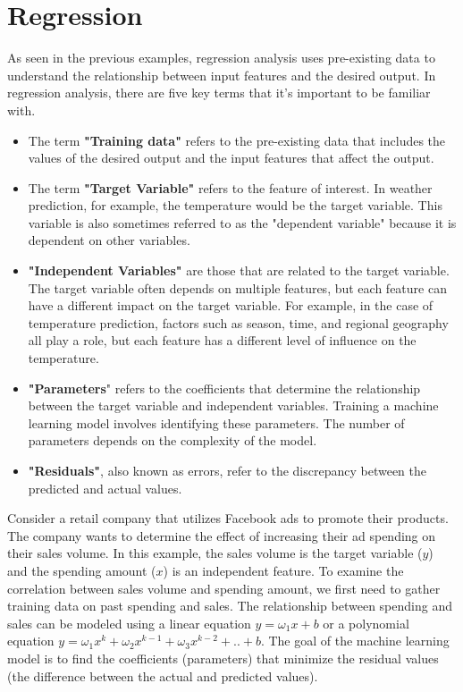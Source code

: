 \chapter{Regression}
As seen in the previous examples, regression analysis uses pre-existing data to understand the relationship between input features and the desired output. In regression analysis, there are five key terms that it's important to be familiar with.

\begin{itemize}
  \item The term \textbf{"Training data"} refers to the pre-existing data that includes the values of the desired output and the input features that affect the output.
  \item The term \textbf{"Target Variable"} refers to the feature of interest. In weather prediction, for example, the temperature would be the target variable. This variable is also sometimes referred to as the "dependent variable" because it is dependent on other variables.
  \item \textbf{"Independent Variables"} are those that are related to the target variable. The target variable often depends on multiple features, but each feature can have a different impact on the target variable. For example, in the case of temperature prediction, factors such as season, time, and regional geography all play a role, but each feature has a different level of influence on the temperature.
  \item \textbf{"Parameters}" refers to the coefficients that determine the relationship between the target variable and independent variables. Training a machine learning model involves identifying these parameters. The number of parameters depends on the complexity of the model.
  \item \textbf{"Residuals"}, also known as errors, refer to the discrepancy between the predicted and actual values.
\end{itemize}

Consider a retail company that utilizes Facebook ads to promote their products. The company wants to determine the effect of increasing their ad spending on their sales volume. In this example, the sales volume is the target variable ($y$) and the spending amount ($x$) is an independent feature. To examine the correlation between sales volume and spending amount, we first need to gather training data on past spending and sales. The relationship between spending and sales can be modeled using a linear equation $y = \omega_1 x + b$ or a polynomial equation $ y = \omega_1 x^k + \omega_2 x^{k-1} + \omega_3 x^{k-2}+ .. + b$. The goal of the machine learning model is to find the coefficients (parameters) that minimize the residual values (the difference between the actual and predicted values).

